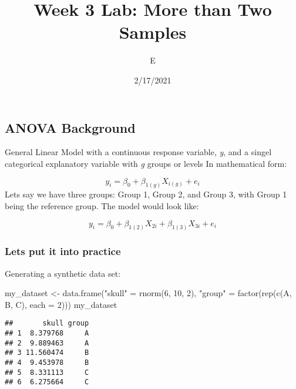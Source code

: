 \documentclass[
]{article}
\title{Week 3 Lab: More than Two Samples}
\author{E}
\date{2/17/2021}
\newenvironment{Shaded}{\begin{snugshade}}{\end{snugshade}}
\newcommand{\AttributeTok}[1]{\textcolor[rgb]{0.77,0.63,0.00}{#1}}
\newcommand{\DecValTok}[1]{\textcolor[rgb]{0.00,0.00,0.81}{#1}}
\newcommand{\FunctionTok}[1]{\textcolor[rgb]{0.00,0.00,0.00}{#1}}
\newcommand{\NormalTok}[1]{#1}
\newcommand{\OtherTok}[1]{\textcolor[rgb]{0.56,0.35,0.01}{#1}}
\newcommand{\StringTok}[1]{\textcolor[rgb]{0.31,0.60,0.02}{#1}}
\begin{document}
\maketitle

\hypertarget{anova-background}{%
\subsection{ANOVA Background}\label{anova-background}}

General Linear Model with a continuous response variable, \emph{y}, and
a singel categorical explanatory variable with \emph{g} groups or levels
In mathematical form:

\[ y_{i} = \beta_0 + \beta_{1(g)}X_{i(g)} + e_i\] Lets say we have three
groups: Group 1, Group 2, and Group 3, with Group 1 being the reference
group. The model would look like:

\[ y_i = \beta_0 + \beta_{1(2)}X_{2i} +  \beta_{1(3)}X_{3i} + e_i \]

\hypertarget{lets-put-it-into-practice}{%
\subsubsection{Lets put it into
practice}\label{lets-put-it-into-practice}}

Generating a synthetic data set:

\begin{Shaded}
\begin{Highlighting}[]
\NormalTok{my\_dataset }\OtherTok{\textless{}{-}} \FunctionTok{data.frame}\NormalTok{(}\StringTok{"skull"} \OtherTok{=} \FunctionTok{rnorm}\NormalTok{(}\DecValTok{6}\NormalTok{, }\DecValTok{10}\NormalTok{, }\DecValTok{2}\NormalTok{), }
                         \StringTok{"group"} \OtherTok{=} \FunctionTok{factor}\NormalTok{(}\FunctionTok{rep}\NormalTok{(}\FunctionTok{c}\NormalTok{(}\StringTok{\textquotesingle{}A\textquotesingle{}}\NormalTok{, }\StringTok{\textquotesingle{}B\textquotesingle{}}\NormalTok{, }\StringTok{\textquotesingle{}C\textquotesingle{}}\NormalTok{), }\AttributeTok{each =} \DecValTok{2}\NormalTok{)))}
\NormalTok{my\_dataset}
\end{Highlighting}
\end{Shaded}

\begin{verbatim}
##       skull group
## 1  8.379768     A
## 2  9.889463     A
## 3 11.560474     B
## 4  9.453978     B
## 5  8.331113     C
## 6  6.275664     C
\end{verbatim}
\end{document}
